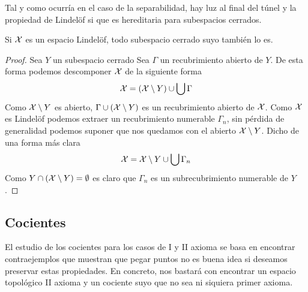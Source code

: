 Tal y como ocurría en el caso de la separabilidad, hay luz al final del túnel y la propiedad de Lindelöf si que es hereditaria para subespacios cerrados.
\begin{lem}
	\label{sep_lem_cerradoLindelofLindelof}
	Si $\mathcal{X}$ es un espacio Lindelöf, todo subespacio cerrado suyo también lo es.
\end{lem}
\begin{proof}
	Sea $Y$ un subespacio cerrado Sea $\Gamma$ un recubrimiento abierto de $Y$. De esta forma podemos descomponer $\mathcal{X}$ de la siguiente forma
	\begin{equation*}
		\mathcal{X}=(\mathcal{X}\setminus Y)\cup\bigcup\Gamma
	\end{equation*}
	Como $\mathcal{X}\setminus Y$ es abierto, $\Gamma\cup(\mathcal{X}\setminus Y)$ es un recubrimiento abierto de $\mathcal{X}$. Como $\mathcal{X}$ es Lindelöf podemos extraer un recubrimiento numerable $\Gamma_n$, sin pérdida de generalidad podemos suponer que nos quedamos con el abierto $\mathcal{X}\setminus Y$. Dicho de una forma más clara
	\begin{equation*}
		\mathcal{X}=\mathcal{X}\setminus Y\cup \bigcup\Gamma_n
	\end{equation*}
	Como $Y\cap(\mathcal{X}\setminus Y)=\emptyset$ es claro que $\Gamma_n$ es un subrecubrimiento numerable de $Y$.
\end{proof}
\subsection{Cocientes}
El estudio de los cocientes para los casos de I y II axioma se basa en encontrar contraejemplos que muestran que pegar puntos no es buena idea si deseamos preservar estas propiedades. En concreto, nos bastará con encontrar un espacio topológico II axioma y un cociente suyo que no sea ni siquiera primer axioma.

